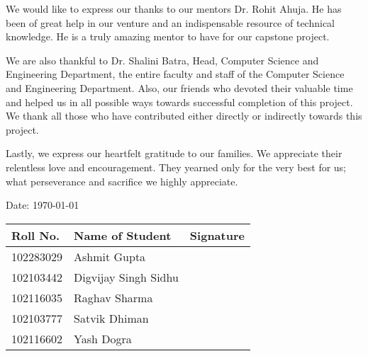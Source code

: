 \noindent We would like to express our thanks to our mentors Dr. Rohit Ahuja. He has been of great help in our venture and an indispensable resource of technical knowledge. He is a truly amazing mentor to have for our capstone project.
\medskip
\par \noindent We are also thankful to Dr. Shalini Batra, Head, Computer Science and Engineering Department, the entire faculty and staff of the Computer Science and Engineering Department. Also, our friends who devoted their valuable time and helped us in all possible ways towards successful completion of this project. We thank all those who have contributed either directly or indirectly towards this project.
\medskip
\par \noindent Lastly, we express our heartfelt gratitude to our families. We appreciate their relentless love and encouragement. They yearned only for the very best for us; what perseverance and sacrifice we highly appreciate.
\medskip
\par \noindent Date: \today
\newline
\begin{table}[H]
	\centering
	\renewcommand{\arraystretch}{1.5}
	\begin{tabularx}{\textwidth}{|X|X|X|}
		\hline
		\textbf{Roll No.} & \textbf{Name of Student} & \textbf{Signature} \\
		\hline
		102283029         & Ashmit Gupta               &                    \\
		\hline
		102103442         & Digvijay Singh Sidhu              &                    \\
		\hline
		102116035         & Raghav Sharma              &                    \\
		\hline
		102103777         & Satvik Dhiman               &                    \\
		\hline
		102116602         & Yash Dogra               &                    \\
		\hline
	\end{tabularx}
\end{table}
